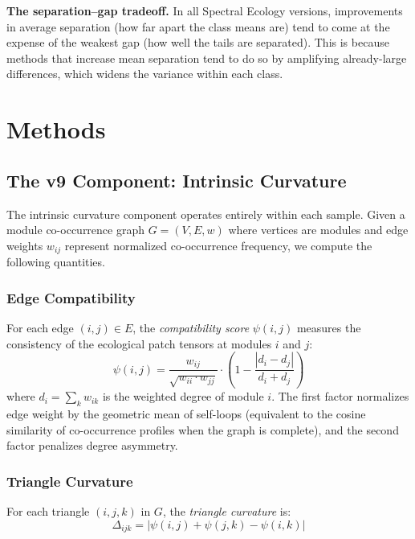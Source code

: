 \documentclass{../yalumba}
\begin{document}
\begin{definition}
\textbf{The separation--gap tradeoff.}  In all Spectral Ecology
versions, improvements in average separation (how far apart the class
means are) tend to come at the expense of the weakest gap (how well
the tails are separated).  This is because methods that increase mean
separation tend to do so by amplifying already-large differences, which
widens the variance within each class.
\end{definition}


\section{Methods}
\label{sec:methods}

\subsection{The v9 Component: Intrinsic Curvature}

The intrinsic curvature component operates entirely within each sample.
Given a module co-occurrence graph $G = (V, E, w)$ where vertices are
modules and edge weights $w_{ij}$ represent normalized co-occurrence
frequency, we compute the following quantities.

\subsubsection{Edge Compatibility}

For each edge $(i,j) \in E$, the \emph{compatibility score} $\psi(i,j)$
measures the consistency of the ecological patch tensors at modules $i$
and $j$:
\begin{equation}
\psi(i,j) = \frac{w_{ij}}{\sqrt{w_{ii} \cdot w_{jj}}} \cdot
\left(1 - \frac{|d_i - d_j|}{d_i + d_j}\right)
\label{eq:compatibility}
\end{equation}
where $d_i = \sum_k w_{ik}$ is the weighted degree of module $i$.  The
first factor normalizes edge weight by the geometric mean of self-loops
(equivalent to the cosine similarity of co-occurrence profiles when the
graph is complete), and the second factor penalizes degree asymmetry.

\subsubsection{Triangle Curvature}

For each triangle $(i,j,k)$ in $G$, the \emph{triangle curvature} is:
\begin{equation}
\Delta_{ijk} = \bigl|\psi(i,j) + \psi(j,k) - \psi(i,k)\bigr|
\label{eq:curvature}
\end{equation}
\end{document}
